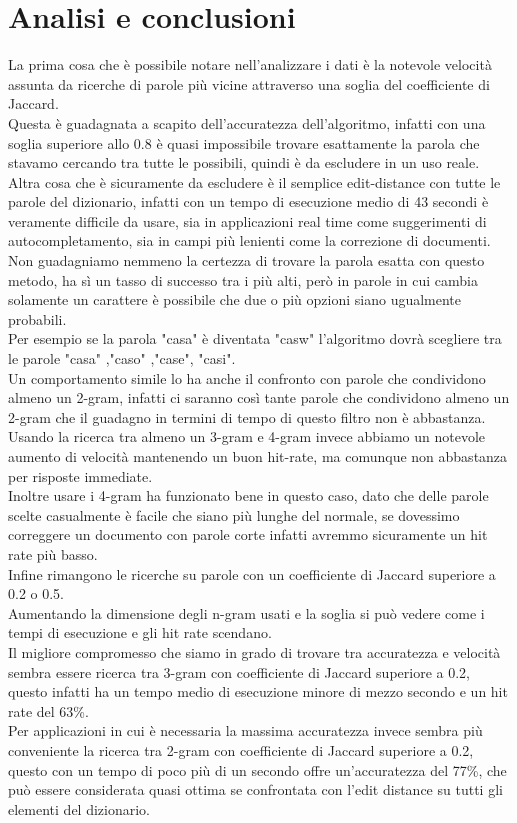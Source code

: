 \documentclass[]{article}
\begin{document}
\section{Analisi e conclusioni}
La prima cosa che è possibile notare nell'analizzare i dati è la notevole velocità assunta da ricerche di parole più vicine attraverso una soglia del coefficiente di Jaccard.\\
Questa è guadagnata a scapito dell'accuratezza dell'algoritmo, infatti con una soglia superiore allo 0.8 è quasi impossibile trovare esattamente la parola che stavamo cercando tra tutte le possibili, quindi è da escludere in un uso reale.\\
Altra cosa che è sicuramente da escludere è il semplice edit-distance con tutte le parole del dizionario, infatti con un tempo di esecuzione medio di 43 secondi è veramente difficile da usare, sia in applicazioni real time come suggerimenti di autocompletamento, sia in campi più lenienti come la correzione di documenti.\\
Non guadagniamo nemmeno la certezza di trovare la parola esatta con questo metodo, ha sì un tasso di successo tra i più alti, però in parole in cui cambia solamente un carattere è possibile che due o più opzioni siano ugualmente probabili.\\
Per esempio se la parola "casa" è diventata "casw" l'algoritmo dovrà scegliere tra le parole "casa" ,"caso" ,"case", "casi".\\
Un comportamento simile lo ha anche il confronto con parole che condividono almeno un 2-gram, infatti ci saranno così tante parole che condividono almeno un 2-gram che il guadagno in termini di tempo di questo filtro non è abbastanza.
Usando la ricerca tra almeno un 3-gram e 4-gram invece abbiamo un notevole aumento di velocità mantenendo un buon hit-rate, ma comunque non abbastanza per risposte immediate.\\
Inoltre usare i 4-gram ha funzionato bene in questo caso, dato che delle parole scelte casualmente è facile che siano più lunghe del normale, se dovessimo correggere un documento con parole corte infatti avremmo sicuramente un hit rate più basso.\\
Infine rimangono le ricerche su parole con un coefficiente di Jaccard superiore a 0.2 o 0.5.\\
Aumentando la dimensione degli n-gram usati e la soglia si può vedere come i tempi di esecuzione e gli hit rate scendano.\\
Il migliore compromesso che siamo in grado di trovare tra accuratezza e velocità sembra essere ricerca tra 3-gram con coefficiente di Jaccard superiore a 0.2, questo infatti ha un tempo medio di esecuzione minore di mezzo secondo e un hit rate del 63\%.\\
Per applicazioni in cui è necessaria la massima accuratezza invece sembra più conveniente la ricerca tra 2-gram con coefficiente di Jaccard superiore a 0.2, questo con un tempo di poco più di un secondo offre un'accuratezza del 77\%, che può essere considerata quasi ottima se confrontata con l'edit distance su tutti gli elementi del dizionario.\\ 
\end{document}
